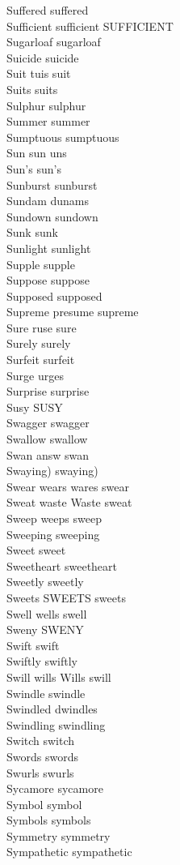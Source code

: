 Suffered suffered\\
Sufficient sufficient SUFFICIENT\\
Sugarloaf sugarloaf\\
Suicide suicide\\
Suit tuis suit\\
Suits suits\\
Sulphur sulphur\\
Summer summer\\
Sumptuous sumptuous\\
Sun sun uns\\
Sun's sun's\\
Sunburst sunburst\\
Sundam dunams\\
Sundown sundown\\
Sunk sunk\\
Sunlight sunlight\\
Supple supple\\
Suppose suppose\\
Supposed supposed\\
Supreme presume supreme\\
Sure ruse sure\\
Surely surely\\
Surfeit surfeit\\
Surge urges\\
Surprise surprise\\
Susy SUSY\\
Swagger swagger\\
Swallow swallow\\
Swan answ swan\\
Swaying) swaying)\\
Swear wears wares swear\\
Sweat waste Waste sweat\\
Sweep weeps sweep\\
Sweeping sweeping\\
Sweet sweet\\
Sweetheart sweetheart\\
Sweetly sweetly\\
Sweets SWEETS sweets\\
Swell wells swell\\
Sweny SWENY\\
Swift swift\\
Swiftly swiftly\\
Swill wills Wills swill\\
Swindle swindle\\
Swindled dwindles\\
Swindling swindling\\
Switch switch\\
Swords swords\\
Swurls swurls\\
Sycamore sycamore\\
Symbol symbol\\
Symbols symbols\\
Symmetry symmetry\\
Sympathetic sympathetic\\

